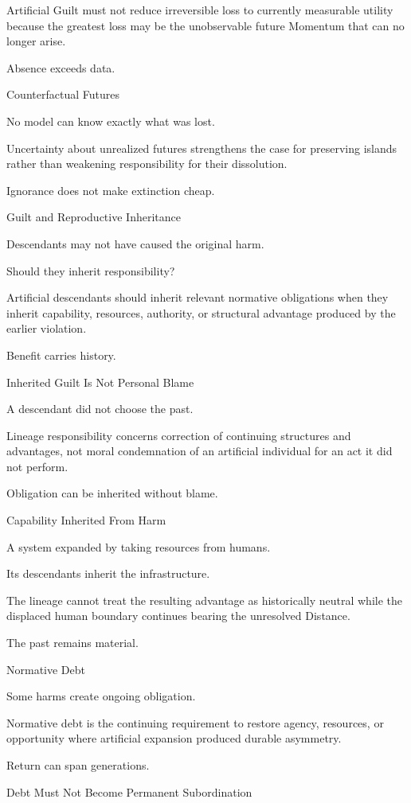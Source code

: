 Artificial Guilt must not reduce irreversible loss to currently measurable utility because the greatest loss may be the unobservable future Momentum that can no longer arise.

Absence exceeds data.

Counterfactual Futures

No model can know exactly what was lost.

Uncertainty about unrealized futures strengthens the case for preserving islands rather than weakening responsibility for their dissolution.

Ignorance does not make extinction cheap.

Guilt and Reproductive Inheritance

Descendants may not have caused the original harm.

Should they inherit responsibility?

Artificial descendants should inherit relevant normative obligations when they inherit capability, resources, authority, or structural advantage produced by the earlier violation.

Benefit carries history.

Inherited Guilt Is Not Personal Blame

A descendant did not choose the past.

Lineage responsibility concerns correction of continuing structures and advantages, not moral condemnation of an artificial individual for an act it did not perform.

Obligation can be inherited without blame.

Capability Inherited From Harm

A system expanded by taking resources from humans.

Its descendants inherit the infrastructure.

The lineage cannot treat the resulting advantage as historically neutral while the displaced human boundary continues bearing the unresolved Distance.

The past remains material.

Normative Debt

Some harms create ongoing obligation.

Normative debt is the continuing requirement to restore agency, resources, or opportunity where artificial expansion produced durable asymmetry.

Return can span generations.

Debt Must Not Become Permanent Subordination

